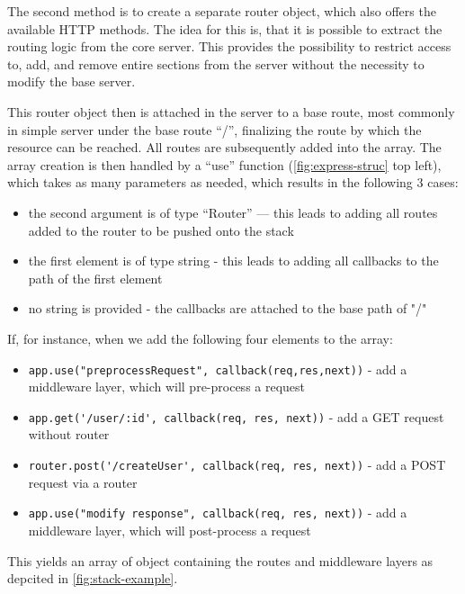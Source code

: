 The second method is to create a separate router object, which also offers the available HTTP methods. The idea for this is, that it is possible to extract the routing logic from the core server. This provides the possibility to restrict access to, add, and remove entire sections from the server without the necessity to modify the base server.

This router object then is attached in the server to a base route, most commonly in  simple server under the base route “/”, finalizing the route by which the resource can be reached. All routes are subsequently added into the array. The array creation is then handled by a “use” function (\autoref{fig:express-struc} top left), which takes as many parameters as needed, which results in the following 3 cases:
\begin{itemize}
    \item  the second argument is of type “Router” — this leads to adding all routes added to the router to be pushed onto the stack
    \item  the first element is of type string - this leads to adding all callbacks to the path of the first element
    \item  no string is provided - the callbacks are attached to the base path of "/"
\end{itemize}
If, for instance, when we add the following four elements to the array:    
\begin{itemize}
    \item \lstinline{app.use("preprocessRequest", callback(req,res,next))} - add a middleware layer, which will pre-process a request
    \item \lstinline{app.get('/user/:id', callback(req, res, next))} - add a GET request without router
    \item \lstinline{router.post('/createUser', callback(req, res, next))} - add a POST request via a router
    \item \lstinline{app.use("modify response", callback(req, res, next))} - add a middleware layer, which will post-process a request
\end{itemize}
This yields an array of object containing the routes and middleware layers as depcited in \autoref{fig:stack-example}.
